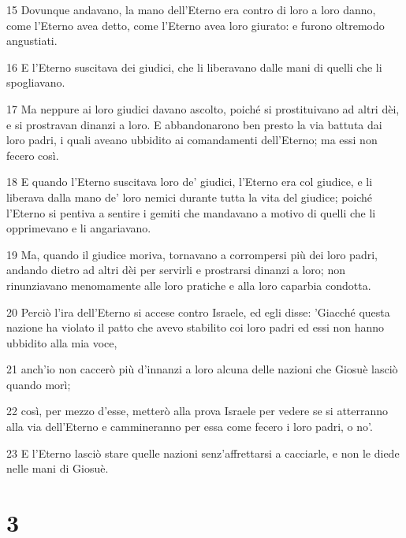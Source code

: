 \par 15 Dovunque andavano, la mano dell'Eterno era contro di loro a loro danno, come l'Eterno avea detto, come l'Eterno avea loro giurato: e furono oltremodo angustiati.
\par 16 E l'Eterno suscitava dei giudici, che li liberavano dalle mani di quelli che li spogliavano.
\par 17 Ma neppure ai loro giudici davano ascolto, poiché si prostituivano ad altri dèi, e si prostravan dinanzi a loro. E abbandonarono ben presto la via battuta dai loro padri, i quali aveano ubbidito ai comandamenti dell'Eterno; ma essi non fecero così.
\par 18 E quando l'Eterno suscitava loro de' giudici, l'Eterno era col giudice, e li liberava dalla mano de' loro nemici durante tutta la vita del giudice; poiché l'Eterno si pentiva a sentire i gemiti che mandavano a motivo di quelli che li opprimevano e li angariavano.
\par 19 Ma, quando il giudice moriva, tornavano a corrompersi più dei loro padri, andando dietro ad altri dèi per servirli e prostrarsi dinanzi a loro; non rinunziavano menomamente alle loro pratiche e alla loro caparbia condotta.
\par 20 Perciò l'ira dell'Eterno si accese contro Israele, ed egli disse: 'Giacché questa nazione ha violato il patto che avevo stabilito coi loro padri ed essi non hanno ubbidito alla mia voce,
\par 21 anch'io non caccerò più d'innanzi a loro alcuna delle nazioni che Giosuè lasciò quando morì;
\par 22 così, per mezzo d'esse, metterò alla prova Israele per vedere se si atterranno alla via dell'Eterno e cammineranno per essa come fecero i loro padri, o no'.
\par 23 E l'Eterno lasciò stare quelle nazioni senz'affrettarsi a cacciarle, e non le diede nelle mani di Giosuè.

\chapter{3}

